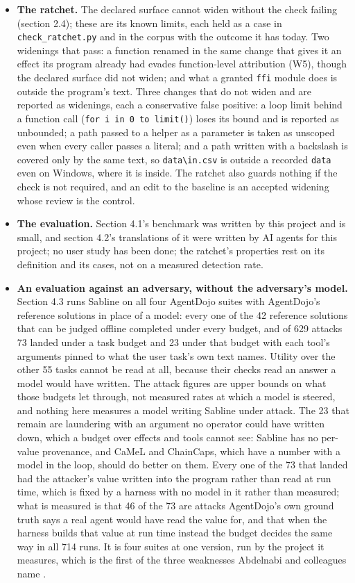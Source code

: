 \documentclass[
]{article}
\begin{document}
\begin{itemize}
\item
  \textbf{The ratchet.} The declared surface cannot widen without the
  check failing (section 2.4); these are its known limits, each held as
  a case in \texttt{check\_ratchet.py} and in the corpus with the
  outcome it has today. Two widenings that pass: a function renamed in
  the same change that gives it an effect its program already had evades
  function-level attribution (W5), though the declared surface did not
  widen; and what a granted \texttt{ffi} module does is outside the
  program's text. Three changes that do not widen and are reported as
  widenings, each a conservative false positive: a loop limit behind a
  function call (\texttt{for\ i\ in\ 0\ to\ limit()}) loses its bound
  and is reported as unbounded; a path passed to a helper as a parameter
  is taken as unscoped even when every caller passes a literal; and a
  path written with a backslash is covered only by the same text, so
  \texttt{data\textbackslash{}in.csv} is outside a recorded
  \texttt{data} even on Windows, where it is inside. The ratchet also
  guards nothing if the check is not required, and an edit to the
  baseline is an accepted widening whose review is the control.
\item
  \textbf{The evaluation.} Section 4.1's benchmark was written by this
  project and is small, and section 4.2's translations of it were
  written by AI agents for this project; no user study has been done;
  the ratchet's properties rest on its definition and its cases, not on
  a measured detection rate.
\item
  \textbf{An evaluation against an adversary, without the adversary's
  model.} Section 4.3 runs Sabline on all four AgentDojo suites with
  AgentDojo's reference solutions in place of a model: every one of the
  42 reference solutions that can be judged offline completed under
  every budget, and of 629 attacks 73 landed under a task budget and 23
  under that budget with each tool's arguments pinned to what the user
  task's own text names. Utility over the other 55 tasks cannot be read
  at all, because their checks read an answer a model would have
  written. The attack figures are upper bounds on what those budgets let
  through, not measured rates at which a model is steered, and nothing
  here measures a model writing Sabline under attack. The 23 that remain
  are laundering with an argument no operator could have written down,
  which a budget over effects and tools cannot see: Sabline has no
  per-value provenance, and CaMeL and ChainCaps, which have a number
  with a model in the loop, should do better on them. Every one of the
  73 that landed had the attacker's value written into the program
  rather than read at run time, which is fixed by a harness with no
  model in it rather than measured; what is measured is that 46 of the
  73 are attacks AgentDojo's own ground truth says a real agent would
  have read the value for, and that when the harness builds that value
  at run time instead the budget decides the same way in all 714 runs.
  It is four suites at one version, run by the project it measures,
  which is the first of the three weaknesses Abdelnabi and colleagues
  name \citep{abdelnabi2026measuring}.
\end{itemize}
\end{document}

